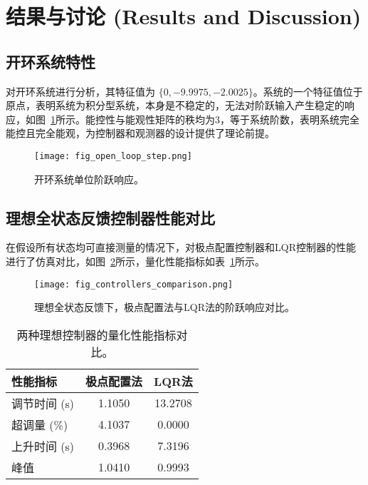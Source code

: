 \documentclass[12pt, a4paper]{article}
\begin{document}
\section{结果与讨论 (Results and Discussion)}

\subsection{开环系统特性}
对开环系统进行分析，其特征值为 $\{0, -9.9975, -2.0025\}$。系统的一个特征值位于原点，表明系统为积分型系统，本身是不稳定的，无法对阶跃输入产生稳定的响应，如图~\ref{fig:open_loop}所示。能控性与能观性矩阵的秩均为3，等于系统阶数，表明系统完全能控且完全能观，为控制器和观测器的设计提供了理论前提。

\begin{figure}[htbp]
    \centering
    \texttt{[image: fig\_open\_loop\_step.png]}
    \caption{开环系统单位阶跃响应。}
    \label{fig:open_loop}
\end{figure}

\subsection{理想全状态反馈控制器性能对比}
在假设所有状态均可直接测量的情况下，对极点配置控制器和LQR控制器的性能进行了仿真对比，如图~\ref{fig:controllers_comparison}所示，量化性能指标如表~\ref{tab:performance}所示。

\begin{figure}[htbp]
    \centering
    \texttt{[image: fig\_controllers\_comparison.png]}
    \caption{理想全状态反馈下，极点配置法与LQR法的阶跃响应对比。}
    \label{fig:controllers_comparison}
\end{figure}

\begin{table}[htbp]
    \centering
    \caption{两种理想控制器的量化性能指标对比。}
    \label{tab:performance}
    \begin{tabular}{lcc}
        \toprule
        \textbf{性能指标} & \textbf{极点配置法} & \textbf{LQR法} \\
        \midrule
        调节时间 (s) & 1.1050 & 13.2708 \\
        超调量 (\%) & 4.1037 & 0.0000 \\
        上升时间 (s) & 0.3968 & 7.3196 \\
        峰值 & 1.0410 & 0.9993 \\
        \bottomrule
    \end{tabular}
\end{table}
\end{document}
